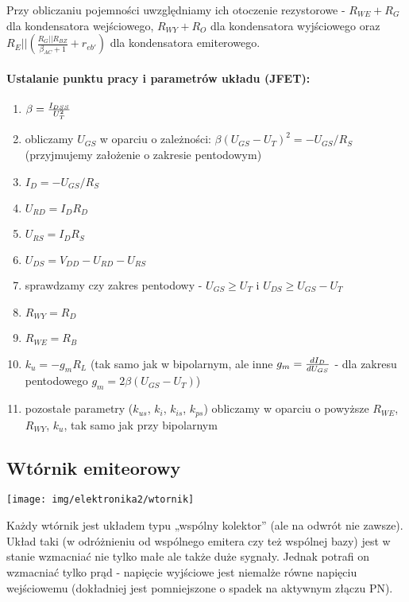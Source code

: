 \documentclass{pdfBooklets}
\begin{document}
Przy obliczaniu pojemności uwzględniamy ich otoczenie rezystorowe - $R_{WE} + R_G$ dla kondensatora wejściowego, $R_{WY} + R_O$ dla kondensatora wyjściowego oraz $R_E || \left(\frac{R_G||R_{BZ}}{\beta_{AC} + 1} + r_{eb'} \right)$ dla kondensatora emiterowego.

\paragraph{Ustalanie punktu pracy i parametrów układu (JFET):}
\begin{enumerate}
	\item $\beta = {I_{DSS} \over U_T^2}$
	\item obliczamy $U_{GS}$ w oparciu o zależności: $\beta (U_{GS} - U_T)^2 = - U_{GS} / R_S$ (przyjmujemy założenie o zakresie pentodowym)
	\item $I_D = - U_{GS} / R_S$
	\item $U_{RD} = I_D R_D$
	\item $U_{RS} = I_D R_S$
	\item $U_{DS} = V_{DD} - U_{RD} - U_{RS}$
	\item sprawdzamy czy zakres pentodowy - $U_{GS} \ge U_T$ i $U_{DS} \ge U_{GS} - U_T$
	\item $R_{WY} = R_D$
	\item $R_{WE} = R_B$
	\item $k_u = -g_m R_L$ (tak samo jak w bipolarnym, ale inne $g_m = {dI_D \over dU_{GS}}$ - dla zakresu pentodowego $g_m=2 \beta (U_{GS} - U_T)$)
	\item pozostałe parametry ($k_{us}$, $k_{i}$, $k_{is}$, $k_{ps}$) obliczamy w oparciu o powyższe $R_{WE}$, $R_{WY}$, $k_{u}$, tak samo jak przy bipolarnym
\end{enumerate}

\subsection{Wtórnik emiteorowy}
\begin{center}\texttt{[image: img/elektronika2/wtornik]}\end{center}

Każdy wtórnik jest układem typu „wspólny kolektor” (ale na odwrót nie zawsze).
Układ taki (w odróżnieniu od wspólnego emitera czy też wspólnej bazy) jest w stanie wzmacniać nie tylko małe ale także duże sygnały.
Jednak potrafi on wzmacniać tylko prąd - napięcie wyjściowe jest niemalże równe napięciu wejściowemu (dokładniej jest pomniejszone o spadek na aktywnym złączu PN).
\end{document}
